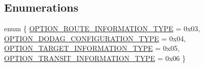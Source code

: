 \subsection*{Enumerations}
\begin{DoxyCompactItemize}
\item 
enum \{ \hyperlink{group___i_c_m_pv6_r_p_l_gga3153161a0d848ec64bf4895db3cf1be4aefc8cf6152a5e97ced0c491b4f933755}{O\+P\+T\+I\+O\+N\+\_\+\+R\+O\+U\+T\+E\+\_\+\+I\+N\+F\+O\+R\+M\+A\+T\+I\+O\+N\+\_\+\+T\+Y\+PE} = 0x03, 
\hyperlink{group___i_c_m_pv6_r_p_l_gga3153161a0d848ec64bf4895db3cf1be4a8ae101d47640a56259fbd9d3b81d88cd}{O\+P\+T\+I\+O\+N\+\_\+\+D\+O\+D\+A\+G\+\_\+\+C\+O\+N\+F\+I\+G\+U\+R\+A\+T\+I\+O\+N\+\_\+\+T\+Y\+PE} = 0x04, 
\hyperlink{group___i_c_m_pv6_r_p_l_gga3153161a0d848ec64bf4895db3cf1be4a4b7e74e751a801b667de7133dfc2fce4}{O\+P\+T\+I\+O\+N\+\_\+\+T\+A\+R\+G\+E\+T\+\_\+\+I\+N\+F\+O\+R\+M\+A\+T\+I\+O\+N\+\_\+\+T\+Y\+PE} = 0x05, 
\hyperlink{group___i_c_m_pv6_r_p_l_gga3153161a0d848ec64bf4895db3cf1be4a92b2d90a0c3f2b454768f22cf80caa78}{O\+P\+T\+I\+O\+N\+\_\+\+T\+R\+A\+N\+S\+I\+T\+\_\+\+I\+N\+F\+O\+R\+M\+A\+T\+I\+O\+N\+\_\+\+T\+Y\+PE} = 0x06
 \}
\end{DoxyCompactItemize}
